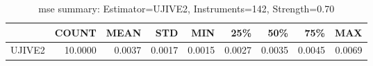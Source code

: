 \begin{table}[ht]
\centering
\caption{mse summary: Estimator=UJIVE2, Instruments=142, Strength=0.70}
\begin{tabular}{lrrrrrrrr}
\toprule
 & COUNT & MEAN & STD & MIN & 25\% & 50\% & 75\% & MAX \\
\midrule
UJIVE2 & 10.0000 & 0.0037 & 0.0017 & 0.0015 & 0.0027 & 0.0035 & 0.0045 & 0.0069 \\
\bottomrule
\end{tabular}
\end{table}

